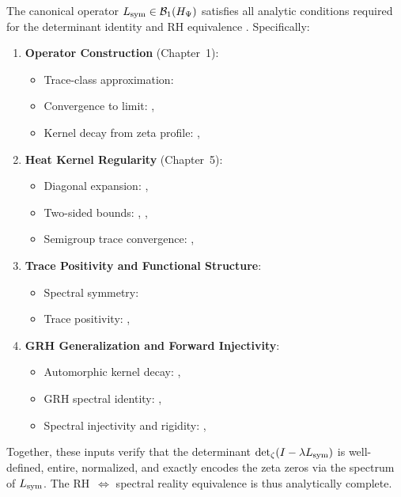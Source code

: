 \begin{lemma}
\label{lem:analytic_closure_core}

The canonical operator \( L_{\mathrm{sym}} \in \mathcal{B}_1(H_{\Psi}) \) satisfies all analytic conditions required for the determinant identity  and RH equivalence . Specifically:

\begin{enumerate}
  \item \textbf{Operator Construction} (Chapter~1):
  \begin{itemize}
    \item Trace-class approximation: 
    \item Convergence to limit: , 
    \item Kernel decay from zeta profile: , 
  \end{itemize}

  \item \textbf{Heat Kernel Regularity} (Chapter~5):
  \begin{itemize}
    \item Diagonal expansion: , 
    \item Two-sided bounds: , , 
    \item Semigroup trace convergence: , 
  \end{itemize}

  \item \textbf{Trace Positivity and Functional Structure}:
  \begin{itemize}
    \item Spectral symmetry: 
    \item Trace positivity: , 
  \end{itemize}

  \item \textbf{GRH Generalization and Forward Injectivity}:
  \begin{itemize}
    \item Automorphic kernel decay: , 
    \item GRH spectral identity: , 
    \item Spectral injectivity and rigidity: , 
  \end{itemize}
\end{enumerate}

Together, these inputs verify that the determinant \(\det\nolimits_{\zeta}(I - \lambda L_{\mathrm{sym}})\) is well-defined, entire, normalized, and exactly encodes the zeta zeros via the spectrum of \( L_{\mathrm{sym}} \). The RH~\(\iff\) spectral reality equivalence  is thus analytically complete.
\end{lemma}
